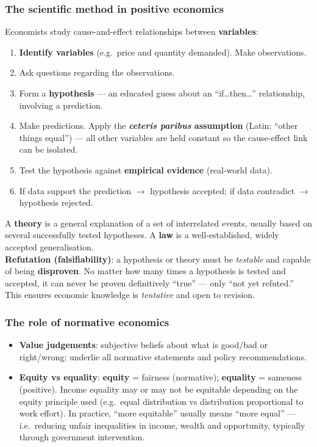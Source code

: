 \documentclass[a4paper,12pt]{article}
\begin{document}
\subsubsection*{The scientific method in positive economics}
Economists study cause-and-effect relationships between \textbf{variables}:
\begin{enumerate}
  \item \textbf{Identify variables} (e.g.\ price and quantity demanded). Make observations.
  \item Ask questions regarding the observations. 
  \item Form a \textbf{hypothesis} --- an educated guess about an ``if\dots then\dots'' relationship, involving a prediction.
  \item Make predictions. Apply the \textbf{\textit{\emph{ceteris paribus}} assumption} (Latin: ``other things equal'') --- all other variables are held constant so the cause-effect link can be isolated.
  \item Test the hypothesis against \textbf{empirical evidence} (real-world data).
  \item If data support the prediction $\to$ hypothesis accepted; if data contradict $\to$ hypothesis rejected.
\end{enumerate}
A \textbf{theory} is a general explanation of a set of interrelated events, usually based on several successfully tested hypotheses. A \textbf{law} is a well-established, widely accepted generalisation.\\
\textbf{Refutation (falsifiability)}: a hypothesis or theory must be \textit{testable} and capable of being \textbf{disproven}. No matter how many times a hypothesis is tested and accepted, it can never be proven definitively ``true'' --- only ``not yet refuted.'' This ensures economic knowledge is \textit{tentative} and open to revision.
\subsubsection*{The role of normative economics}
\begin{itemize}
  \item \textbf{Value judgements}: subjective beliefs about what is good/bad or right/wrong; underlie all normative statements and policy recommendations.
  \item \textbf{Equity vs equality}: \textbf{equity} = fairness (normative); \textbf{equality} = sameness (positive). Income equality may or may not be equitable depending on the equity principle used (e.g.\ equal distribution vs distribution proportional to work effort). In practice, ``more equitable'' usually means ``more equal'' --- i.e.\ reducing unfair inequalities in income, wealth and opportunity, typically through government intervention.
\end{itemize}
\end{document}

